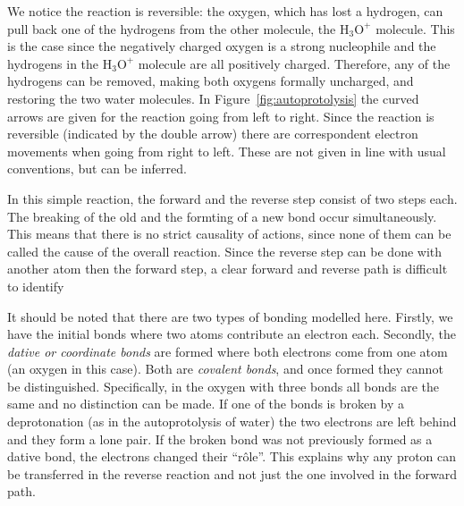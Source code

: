 \documentclass[runningheads]{llncs}
\begin{document}
We notice the reaction is reversible: the oxygen, which has lost a hydrogen, can 
pull back one of the hydrogens from the other molecule, the  $\mathrm{H_3O^+}$ molecule. This is the case since the negatively 
charged oxygen is a strong nucleophile and the hydrogens in the $\mathrm{H_3O^+}$ molecule are 
all positively charged. Therefore, any of the hydrogens 
can be removed, making both oxygens formally uncharged, and restoring the two water 
molecules. In Figure~\ref{fig:autoprotolysis} the curved arrows are given for the reaction going from left to right. Since the reaction is reversible (indicated by the double arrow) there are correspondent electron movements when going from right to left. These are not given in line with usual conventions, but can be inferred.

In this simple reaction, the forward and the reverse step consist of two steps each. The breaking of the old and the formting of a new bond occur simultaneously. This means that there is no strict causality of actions, since none of them can be called the cause of the overall reaction. Since the reverse step can be done with another atom then the forward step, a clear forward and reverse path is difficult to identify

It should be noted that there are two types of bonding modelled here. Firstly, we have the initial bonds where two atoms contribute an electron each. Secondly, the \emph{dative or coordinate bonds} are formed where both electrons come from one atom (an oxygen in this case). Both are \emph{covalent bonds}, and once formed they cannot be distinguished. Specifically, in the oxygen with three bonds all bonds are the same and no distinction can be made. If one of the bonds is broken by a deprotonation (as in the autoprotolysis of water) the two electrons are left behind and they form a lone pair. If the broken bond was not previously formed as a dative bond, the electrons changed their ``r\^{o}le''. This explains why any proton can be transferred in the reverse reaction and not just the one involved in the forward path.
\end{document}
